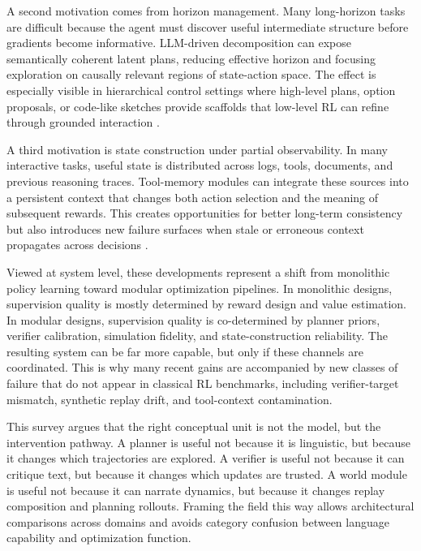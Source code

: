 ﻿\documentclass[conference]{IEEEtran}
\begin{document}
A second motivation comes from horizon management. Many long-horizon tasks are difficult because the agent must discover useful intermediate structure before gradients become informative. LLM-driven decomposition can expose semantically coherent latent plans, reducing effective horizon and focusing exploration on causally relevant regions of state-action space. The effect is especially visible in hierarchical control settings where high-level plans, option proposals, or code-like sketches provide scaffolds that low-level RL can refine through grounded interaction \cite{arxiv_p_2303_16563,arxiv_p_2405_01534,arxiv_p_2512_12716,arxiv_p_2601_14140}.

A third motivation is state construction under partial observability. In many interactive tasks, useful state is distributed across logs, tools, documents, and previous reasoning traces. Tool-memory modules can integrate these sources into a persistent context that changes both action selection and the meaning of subsequent rewards. This creates opportunities for better long-term consistency but also introduces new failure surfaces when stale or erroneous context propagates across decisions \cite{arxiv_p_2511_14460,arxiv_p_2602_00994,arxiv_p_2601_07264,arxiv_p_2601_02439}.

Viewed at system level, these developments represent a shift from monolithic policy learning toward modular optimization pipelines. In monolithic designs, supervision quality is mostly determined by reward design and value estimation. In modular designs, supervision quality is co-determined by planner priors, verifier calibration, simulation fidelity, and state-construction reliability. The resulting system can be far more capable, but only if these channels are coordinated. This is why many recent gains are accompanied by new classes of failure that do not appear in classical RL benchmarks, including verifier-target mismatch, synthetic replay drift, and tool-context contamination.

This survey argues that the right conceptual unit is not the model, but the intervention pathway. A planner is useful not because it is linguistic, but because it changes which trajectories are explored. A verifier is useful not because it can critique text, but because it changes which updates are trusted. A world module is useful not because it can narrate dynamics, but because it changes replay composition and planning rollouts. Framing the field this way allows architectural comparisons across domains and avoids category confusion between language capability and optimization function.
\end{document}
